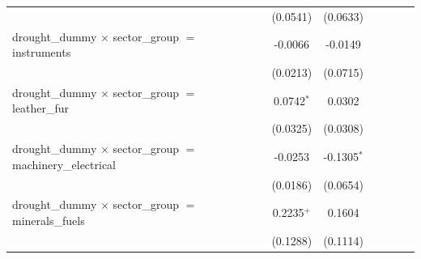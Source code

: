 \begin{tabular}{lcccccccc}
                                                                                  &                       &                       & (0.0541)              & (0.0633)              &                       &                       &                       &   \\   
   drought\_dummy $\times$ sector\_group $=$ instruments                          &                       &                       & -0.0066               & -0.0149               &                       &                       &                       &   \\   
                                                                                  &                       &                       & (0.0213)              & (0.0715)              &                       &                       &                       &   \\   
   drought\_dummy $\times$ sector\_group $=$ leather\_fur                         &                       &                       & 0.0742$^{*}$          & 0.0302                &                       &                       &                       &   \\   
                                                                                  &                       &                       & (0.0325)              & (0.0308)              &                       &                       &                       &   \\   
   drought\_dummy $\times$ sector\_group $=$ machinery\_electrical                &                       &                       & -0.0253               & -0.1305$^{*}$         &                       &                       &                       &   \\   
                                                                                  &                       &                       & (0.0186)              & (0.0654)              &                       &                       &                       &   \\   
   drought\_dummy $\times$ sector\_group $=$ minerals\_fuels                      &                       &                       & 0.2235$^{+}$          & 0.1604                &                       &                       &                       &   \\   
                                                                                  &                       &                       & (0.1288)              & (0.1114)              &                       &                       &                       &   \\   

\end{tabular}
